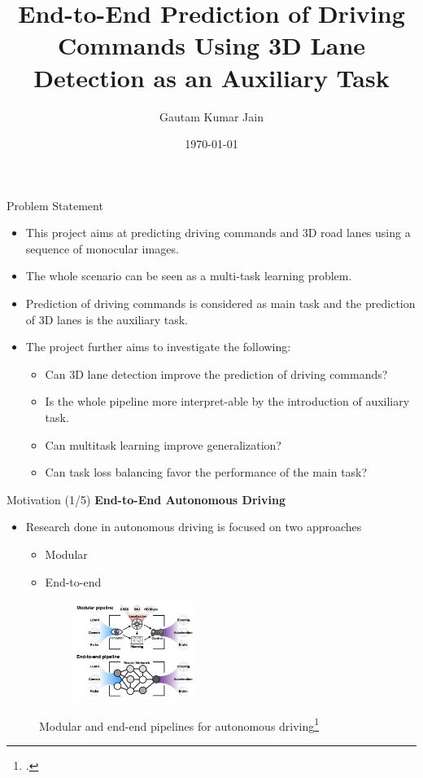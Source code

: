 \documentclass[aspectratio=169]{beamer}
\author[Jain]{Gautam Kumar Jain}
\title{End-to-End Prediction of Driving
Commands Using 3D Lane Detection as an
Auxiliary Task}
\institute[HBRS]{Hochschule Bonn-Rhein-Sieg}
\date{\today}
\begin{document}
{
\begin{frame}
\titlepage
\end{frame}
}

\begin{frame}{Problem Statement}
    \begin{itemize}
        \item This project aims at predicting driving commands and 3D road lanes using a sequence of monocular images.
        \item The whole scenario can be seen as a multi-task learning problem.
        \item Prediction of driving commands is considered as main task and the prediction of 3D lanes is the auxiliary task.
        \item The project further aims to investigate the following: 
        \begin{itemize}
            \item Can 3D lane detection improve the prediction of driving commands? 
            \item Is the whole pipeline more interpret-able by the introduction of auxiliary task.
            \item Can multitask learning improve generalization? 
            \item Can task loss balancing favor the performance of the main task? 
        \end{itemize}
    \end{itemize}
\end{frame}

\begin{frame}{Motivation (1/5)}
  \textbf{End-to-End Autonomous Driving}
  \begin{itemize}
    \item Research done in autonomous driving is focused on two approaches
        \begin{itemize}
            \item Modular 
            \item End-to-end 
        \end{itemize}
        
  \end{itemize}
    \begin{figure}[H]
     \centering
     
\begin{subfigure}{\textwidth}
\includegraphics[width=0.4\linewidth, height=3.2cm]{images/end-modular.png} 
\label{fig:subim1}
\end{subfigure}

\caption{Modular and end-end pipelines for autonomous driving\footcite{DBLP:journals/corr/abs-2003-06404}}
\label{fig:image2}
\end{figure}
\end{frame}
\end{document}
